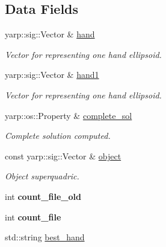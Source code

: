 \subsection*{Data Fields}
\begin{DoxyCompactItemize}
\item 
yarp\+::sig\+::\+Vector \& \hyperlink{classGraspComputation_a180a48b0a2d730ba28545a18d9f0f7fc}{hand}\label{classGraspComputation_a180a48b0a2d730ba28545a18d9f0f7fc}

\begin{DoxyCompactList}\small\item\em Vector for representing one hand ellipsoid. \end{DoxyCompactList}\item 
yarp\+::sig\+::\+Vector \& \hyperlink{classGraspComputation_a8577b68dddb60360dc5ecd1b87440297}{hand1}\label{classGraspComputation_a8577b68dddb60360dc5ecd1b87440297}

\begin{DoxyCompactList}\small\item\em Vector for representing one hand ellipsoid. \end{DoxyCompactList}\item 
yarp\+::os\+::\+Property \& \hyperlink{classGraspComputation_a2a53b7cb2bd19461860d41953bf92c59}{complete\+\_\+sol}\label{classGraspComputation_a2a53b7cb2bd19461860d41953bf92c59}

\begin{DoxyCompactList}\small\item\em Complete solution computed. \end{DoxyCompactList}\item 
const yarp\+::sig\+::\+Vector \& \hyperlink{classGraspComputation_a191eeabb17147b0d091332008fc923c8}{object}\label{classGraspComputation_a191eeabb17147b0d091332008fc923c8}

\begin{DoxyCompactList}\small\item\em Object superquadric. \end{DoxyCompactList}\item 
int {\bfseries count\+\_\+file\+\_\+old}\label{classGraspComputation_a7c13a764201910023cd0ca2800224f4a}

\item 
int {\bfseries count\+\_\+file}\label{classGraspComputation_ad811834d2f0289c1413f0c549205c2f9}

\item 
std\+::string \hyperlink{classGraspComputation_a429ee80f2e9aa3717cf4566cc638b0da}{best\+\_\+hand}\label{classGraspComputation_a429ee80f2e9aa3717cf4566cc638b0da}


\end{DoxyCompactItemize}
